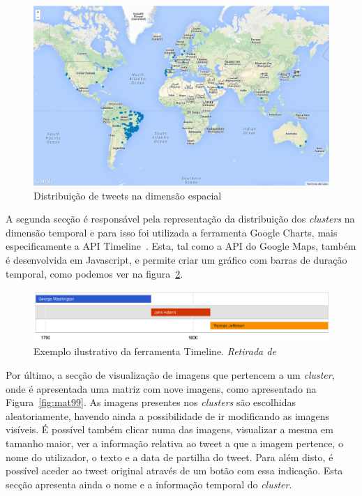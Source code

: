 \begin{figure}[h]
\centering
\includegraphics[width=1.0\linewidth]{./figures/olhopassarinho/map1.png}
\caption{Distribuição de tweets na dimensão espacial}
\label{fig:map1}
\end{figure}

A segunda secção é responsável pela representação da distribuição dos \textit{clusters} na dimensão temporal e para isso foi utilizada a ferramenta Google Charts, mais especificamente a API Timeline~\cite{googletimeline}. Esta, tal como a API do Google Maps, também é desenvolvida em Javascript, e permite criar um gráfico com barras de duração temporal, como podemos ver na figura~\ref{fig:timeex}. 

\begin{figure}[h]
\centering
\includegraphics[width=1.0\linewidth]{./figures/olhopassarinho/time_example.png}
\caption{Exemplo ilustrativo da ferramenta Timeline. \textit{Retirada de}~\cite{googletimeline}}
\label{fig:timeex}
\end{figure}

Por último, a secção de visualização de imagens que pertencem a um \textit{cluster}, onde é apresentada uma matriz com nove imagens, como apresentado na Figura~\ref{fig:mat99}. As imagens presentes nos \textit{clusters} são escolhidas aleatoriamente, havendo ainda a possibilidade de ir modificando as imagens visíveis. É possível também clicar numa das imagens, visualizar a mesma em tamanho maior, ver a informação relativa ao tweet a que a imagem pertence, o nome do utilizador, o texto e a data de partilha do tweet. Para além disto, é possível aceder ao tweet original através de um botão com essa indicação. Esta secção apresenta ainda o nome e a informação temporal do \textit{cluster}.

